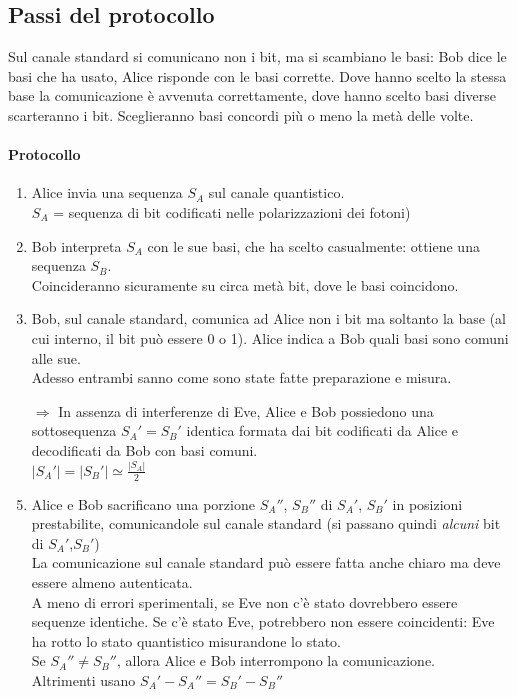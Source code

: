 \documentclass[10pt]{book}
\begin{document}
\subsection{Passi del protocollo}
Sul canale standard si comunicano non i bit, ma si scambiano le basi: Bob dice le basi che ha usato, Alice risponde con le basi corrette. Dove hanno scelto la stessa base la comunicazione è avvenuta correttamente, dove hanno scelto basi diverse scarteranno i bit. Sceglieranno basi concordi più o meno la metà delle volte.
\paragraph{Protocollo} \begin{enumerate}
	\item Alice invia una sequenza $S_A$ sul canale quantistico.\\$S_A$ = sequenza di bit codificati nelle polarizzazioni dei fotoni)
	\item Bob interpreta $S_A$ con le sue basi, che ha scelto casualmente: ottiene una sequenza $S_B$.\\
	Coincideranno sicuramente su circa metà bit, dove le basi coincidono.
	\item Bob, sul canale standard, comunica ad Alice non i bit ma soltanto la base (al cui interno, il bit può essere 0 o 1). Alice indica a Bob quali basi sono comuni alle sue.\\
	Adesso entrambi sanno come sono state fatte preparazione e misura.
	\item[$\Rightarrow$] In assenza di interferenze di Eve, Alice e Bob possiedono una sottosequenza $S_A' = S_B'$ identica formata dai bit codificati da Alice e decodificati da Bob con basi comuni.\\
	$|S_A'|=|S_B'| \simeq \frac{|S_A|}{2}$
	\item Alice e Bob sacrificano una porzione $S_A''$, $S_B''$ di $S_A'$, $S_B'$ in posizioni prestabilite, comunicandole sul canale standard (si passano quindi \textit{alcuni} bit di $S_A'$,$S_B'$)\\
	La comunicazione sul canale standard può essere fatta anche chiaro ma deve essere almeno autenticata.\\
	A meno di errori sperimentali, se Eve non c'è stato dovrebbero essere sequenze identiche. Se c'è stato Eve, potrebbero non essere coincidenti: Eve ha rotto lo stato quantistico misurandone lo stato.\\
	Se $S_A''\neq S_B''$, allora Alice e Bob interrompono la comunicazione.\\
	Altrimenti usano $S_A' - S_A'' = S_B' - S_B''$
\end{enumerate}
\end{document}
